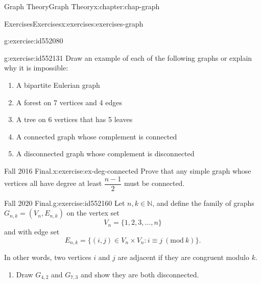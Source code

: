 \documentclass[oneside,10pt,]{book}
\numberwithin{equation}{section}
\newcommand{\Mod}[1]{\ \left(\mathrm{mod}\ #1\right)}
\begin{document}
\begin{chapterptx}{Graph Theory}{}{Graph Theory}{}{}{x:chapter:chap-graph}
\begin{exercises-section}{Exercises}{}{Exercises}{}{}{x:exercises:exercises-graph}
\begin{divisionexercise}{25}{}{}{g:exercise:id552080}
\begin{sidebyside}{1}{0.38}{0.38}{0}
\begin{sbspanel}{0.24}
{
}%
\end{sbspanel}%
\end{sidebyside}%
\end{divisionexercise}%
\begin{divisionexercise}{26}{}{}{g:exercise:id552131}%
Draw an example of each of the following graphs or explain why it is impossible:%
\begin{enumerate}[label=(\alph*)]
\item{}A bipartite Eulerian graph%
\item{}A forest on 7 vertices and 4 edges%
\item{}A tree on 6 vertices that has 5 leaves%
\item{}A connected graph whose complement is connected%
\item{}A disconnected graph whose complement is disconnected%
\end{enumerate}
%
\end{divisionexercise}%
\begin{divisionexercise}{27}{Fall 2016 Final.}{}{x:exercise:ex-deg-connected}%
Prove that any simple graph whose vertices all have degree at least \(\dfrac{n-1}{2}\) must be connected.%
\end{divisionexercise}%
\begin{divisionexercise}{28}{Fall 2020 Final.}{}{g:exercise:id552160}%
Let \(n,k \in \mathbb{N}\), and define the family of graphs \(G_{n,k} = (V_{n},E_{n,k})\) on the vertex set%
\begin{equation*}
V_n = \{1,2,3,\ldots,n\}
\end{equation*}
and with edge set%
\begin{equation*}
E_{n,k} = \{(i,j) \in V_n \times V_n: i \equiv j \Mod{k}\}\text{.}
\end{equation*}
%
\par
In other words, two vertices \(i\) and \(j\) are adjacent if they are congruent modulo \(k\).%
\begin{enumerate}[label=(\alph*)]
\item{}Draw \(G_{4,2}\) and \(G_{7,3}\) and show they are both disconnected.%

\end{enumerate}
\end{divisionexercise}
\end{exercises-section}
\end{chapterptx}
\end{document}

